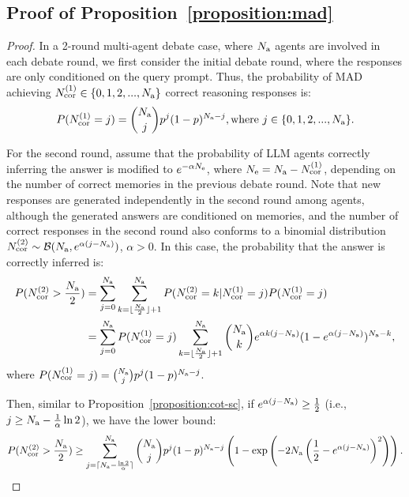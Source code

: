 \documentclass{article} %
\theoremstyle{plain}
\begin{document}
\subsection{Proof of Proposition~\ref{proposition:mad}}
\begin{proof}
    In a 2-round multi-agent debate case, where $N_{\rm a}$ agents are involved in each debate round, we first consider the initial debate round, where the responses are only conditioned on the query prompt. Thus, the probability of MAD achieving $N^{(1)}_{\rm cor}\in\{0, 1, 2, ..., N_{\rm a}\}$ correct reasoning responses is:
    \[
        P(N^{(1)}_{\rm cor}=j)=\binom{N_{\rm a}}{j}p^j(1-p)^{N_{\rm a}-j}, \text{where}\ j\in\{0, 1, 2, ..., N_{\rm a}\}.
    \]

    For the second round, assume that the probability of LLM agents correctly inferring the answer is modified to $e^{-\alpha N_{\rm e}}$, where $N_{\rm e}=N_{\rm a}-N^{(1)}_{\rm cor}$, depending on the number of correct memories in the previous debate round. Note that new responses are generated independently in the second round among agents, although the generated answers are conditioned on memories, and the number of correct responses in the second round also conforms to a binomial distribution $N^{(2)}_{\rm cor}\sim\mathcal{B}(N_{\rm a}, e^{\alpha(j-N_{\rm a})})$, $\alpha>0$. In this case, the probability that the answer is correctly inferred is:
    \[
    \begin{aligned}
        P(N^{(2)}_{\rm cor}>\frac{N_{\rm a}}{2}) &= \sum_{j=0}^{N_{\rm a}}\sum_{k=\lfloor \frac{N_{\rm a}}{2}\rfloor+1}^{N_{\rm a}}P(N^{(2)}_{\rm cor}=k|N^{(1)}_{\rm cor}=j)P(N^{(1)}_{\rm cor}=j) \\
        &= \sum_{j=0}^{N_{\rm a}}P(N^{(1)}_{\rm cor}=j)\sum_{k=\lfloor \frac{N_{\rm a}}{2}\rfloor+1}^{N_{\rm a}}\binom{N_{\rm a}}{k}e^{\alpha k(j-N_{\rm a})}(1-e^{\alpha(j-N_{\rm a})})^{N_{\rm a}-k},
    \end{aligned}
    \]
    where $P(N^{(1)}_{\rm cor}=j)=\binom{N_{\rm a}}{j}p^j(1-p)^{N_{\rm a}-j}$.

    Then, similar to Proposition~\ref{proposition:cot-sc}, if $e^{\alpha(j-N_{\rm a})}\geq\frac{1}{2}$ (i.e., $j\ge N_{\rm a}-\frac{1}{\alpha}\ln 2$), we have the lower bound:
    \[
        P(N^{(2)}_{\rm cor}>\frac{N_{\rm a}}{2}) \geq \sum_{j=\lceil N_{\rm a}-\frac{\ln2}{\alpha}\rceil}^{N_{\rm a}}\binom{N_{\rm a}}{j}p^j(1-p)^{N_{\rm a}-j}\left(1-\exp\left(-2N_{\rm a}\left(\frac{1}{2}-e^{\alpha(j-N_{\rm a})}\right)^2\right)\right).
    \]
    

\end{proof}
\end{document}
